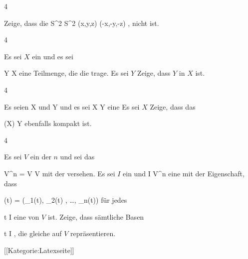 {4}
{

Zeige, dass die
\maabbeledisp {} {S^2} {S^2
} {(x,y,z)} {(-x,-y,-z)
} {,}
nicht
ist.

}
{} {}

{4}
{

Es sei $X$ ein
und es sei

\mavergleichskette
{\vergleichskette
{Y
}
{ \subseteq }{ X
}
{  }{
}
{    }{
}
{   }{
}
}
{}{}{}
eine Teilmenge, die die
trage. Es sei $Y$
Zeige, dass $Y$
in $X$ ist.

}
{} {}

{4}
{

Es seien
\mathkor {} {X} {und} {Y} {}
und es sei
\maabbdisp {\varphi} { X } { Y
} {}
eine
Es sei $X$
Zeige, dass das

\mavergleichskette
{\vergleichskette
{ \varphi(X)
}
{ \subseteq }{ Y
}
{  }{
}
{    }{
}
{   }{
}
}
{}{}{}
ebenfalls kompakt ist.

}
{} {}

{4}
{

Es sei $V$ ein
der
$n$ und sei das

\mavergleichskette
{\vergleichskette
{ V^n
}
{ = }{ V \times \cdots \times V
}
{  }{
}
{    }{
}
{   }{
}
}
{}{}{}
mit der
versehen. Es sei $I$ ein
und
\maabbdisp {\varphi} { I } { V^n
} {}
eine
mit der Eigenschaft, dass

\mavergleichskettedisp
{\vergleichskette
{ \varphi(t)
}
{ =} { (\varphi_1(t), \varphi_2(t) , \ldots , \varphi_n(t))
}
{ } {
}
{ } {
}
{ } {
}
}
{}{}{}
für jedes

\mavergleichskette
{\vergleichskette
{ t
}
{ \in }{ I
}
{  }{
}
{    }{
}
{   }{
}
}
{}{}{}
eine
von $V$ ist. Zeige, dass sämtliche Basen

 {}
 {t \in I} {}
 {} {} {} {,}
die gleiche
auf $V$ repräsentieren.

}
{} {}

 [[Kategorie:Latexseite]]
